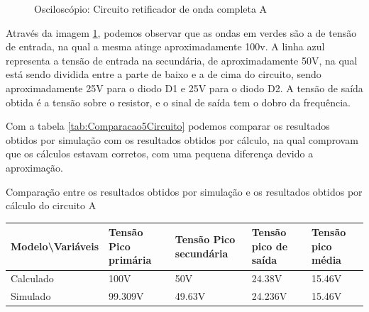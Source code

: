 \begin{figure}[H]
    \centering
    \caption{Osciloscópio: Circuito retificador de onda completa A}
    \vspace{-0.3cm}
    \label{fig:OsciloscopioCircuito05}
\end{figure}

Através da imagem \ref{fig:OsciloscopioCircuito05}, podemos observar que as ondas em verdes são a de tensão de entrada, na qual a mesma atinge aproximadamente 100v. A linha azul representa a tensão de entrada na secundária, de aproximadamente 50V, na qual está sendo dividida entre a parte de baixo e a de cima do circuito, sendo aproximadamente 25V para o diodo D1 e 25V para o diodo D2. A tensão de saída obtida é a tensão sobre o resistor, e o sinal de saída tem o dobro da frequência.

Com a tabela \ref{tab:Comparacao5Circuito} podemos comparar os resultados obtidos por simulação com os resultados obtidos por cálculo, na qual comprovam que os cálculos estavam corretos, com uma pequena diferença devido a aproximação.

\begin{quadro}[H]
    \centering
    \caption{Comparação entre os resultados obtidos por simulação e os resultados obtidos por cálculo do circuito A}
    \begin{tabular}{|C{0.19\textwidth}|C{0.18\textwidth}|C{0.18\textwidth}|C{0.18\textwidth}|C{0.18\textwidth}|}
        \hline
        \textbf{Modelo\textbackslash{}Variáveis} & \textbf{Tensão Pico primária} & \textbf{Tensão Pico secundária} & \textbf{Tensão pico de saída} & \textbf{Tensão pico média}\\
        \hline
        Calculado & 100V & 50V & 24.38V & 15.46V \\
        \hline
        Simulado & 99.309V & 49.63V & 24.236V & 15.46V \\
        \hline
    \end{tabular}
    \vspace{-0.6cm}
    \label{tab:Comparacao5Circuito}
\end{quadro}

